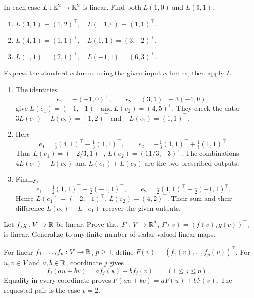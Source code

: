 \begin{problem}\label{ex:04:two-values}
In each case \(L:\mathbb R^2\to\mathbb R^2\) is linear. Find both \(L(1,0)\) and \(L(0,1)\).
\begin{enumerate}
\item \(L(3,1)=(1,2)^\top,\quad L(-1,0)=(1,1)^\top\).
\item \(L(4,1)=(1,1)^\top,\quad L(1,1)=(3,-2)^\top\).
\item \(L(1,1)=(2,1)^\top,\quad L(-1,1)=(6,3)^\top\).
\end{enumerate}
\end{problem}
\begin{solution}
Express the standard columns using the given input columns, then apply \(L\).
\begin{enumerate}
\item The identities
\[
e_1=-(-1,0)^\top,\qquad e_2=(3,1)^\top+3(-1,0)^\top
\]
give \(L(e_1)=(-1,-1)^\top\) and \(L(e_2)=(4,5)^\top\).
They check the data: \(3L(e_1)+L(e_2)=(1,2)^\top\) and
\(-L(e_1)=(1,1)^\top\).
\item Here
\[
e_1=\tfrac13(4,1)^\top-\tfrac13(1,1)^\top,\qquad
e_2=-\tfrac13(4,1)^\top+\tfrac43(1,1)^\top.
\]
Thus \(L(e_1)=(-2/3,1)^\top\), \(L(e_2)=(11/3,-3)^\top\).
The combinations \(4L(e_1)+L(e_2)\) and \(L(e_1)+L(e_2)\)
are the two prescribed outputs.
\item Finally,
\[
e_1=\tfrac12(1,1)^\top-\tfrac12(-1,1)^\top,\qquad
e_2=\tfrac12(1,1)^\top+\tfrac12(-1,1)^\top.
\]
Hence \(L(e_1)=(-2,-1)^\top\), \(L(e_2)=(4,2)^\top\).
Their sum and their difference \(L(e_2)-L(e_1)\) recover the given outputs.
\end{enumerate}
\end{solution}

\begin{problem}\label{ex:04:coordinate-maps}
Let \(f,g:V\to\mathbb R\) be linear. Prove that
\(F:V\to\mathbb R^2\), \(F(v)=(f(v),g(v))^\top\), is linear.
Generalize to any finite number of scalar-valued linear maps.
\end{problem}
\begin{solution}
For linear \(f_1,\ldots,f_p:V\to\mathbb R\), \(p\geqslant1\), define
\(F(v)=(f_1(v),\ldots,f_p(v))^\top\).
For \(u,v\in V\) and \(a,b\in\mathbb R\), coordinate \(j\) gives
\[
f_j(au+bv)=af_j(u)+bf_j(v)\qquad(1\leqslant j\leqslant p).
\]
Equality in every coordinate proves \(F(au+bv)=aF(u)+bF(v)\).
The requested pair is the case \(p=2\).
\end{solution}

